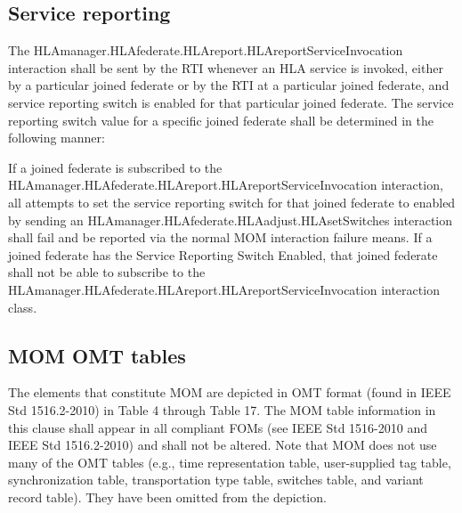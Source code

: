 \begin{compactstdpage}
    \subsection{Service reporting}

    The HLAmanager.\allowbreak{}HLAfederate.\allowbreak{}HLAreport.\allowbreak{}HLAreportServiceInvocation interaction shall be sent by the RTI whenever an HLA service is invoked, either by a particular joined federate or by the RTI at a particular joined federate, and service reporting switch is enabled for that particular joined federate. The service reporting switch value for a specific joined federate shall be determined in the following manner:


    If a joined federate is subscribed to the HLAmanager.\allowbreak{}HLAfederate.\allowbreak{}HLAreport.\allowbreak{}HLAreportServiceInvocation interaction, all attempts to set the service reporting switch for that joined federate to enabled by sending an HLAmanager.\allowbreak{}HLAfederate.\allowbreak{}HLAadjust.\allowbreak{}HLAsetSwitches interaction shall fail and be reported via the normal MOM interaction failure means. If a joined federate has the Service Reporting Switch Enabled, that joined federate shall not be able to subscribe to the HLAmanager.\allowbreak{}HLAfederate.\allowbreak{}HLAreport.\allowbreak{}HLAreportServiceInvocation interaction class.

    \subsection{MOM OMT tables}

    The elements that constitute MOM are depicted in OMT format (found in IEEE Std 1516.2-2010) in Table 4 through Table 17. The MOM table information in this clause shall appear in all compliant FOMs (see IEEE Std 1516-2010 and IEEE Std 1516.2-2010) and shall not be altered. Note that MOM does not use many of the OMT tables (e.g., time representation table, user-supplied tag table, synchronization table, transportation type table, switches table, and variant record table). They have been omitted from the depiction.


\end{compactstdpage}
